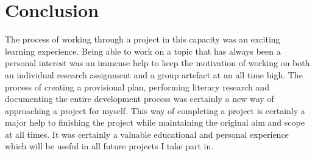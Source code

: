 \section{Conclusion}
The process of working through a project in this capacity was an exciting learning experience. Being able to work on a topic that has always been a personal interest was an immense help to keep the motivation of working on both an individual research assignment and a group artefact at an all time high. The process of creating a provisional plan, performing literary research and documenting the entire development process was certainly a new way of approaching a project for myself. This way of completing a project is certainly a major help to finishing the project while maintaining the original aim and scope at all times. It was certainly a valuable educational and personal experience which will be useful in all future projects I take part in. 